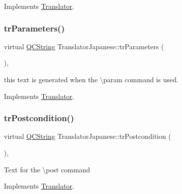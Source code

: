 Implements \mbox{\hyperlink{class_translator}{Translator}}.

\mbox{\label{class_translator_japanese_a34997a683bc00a6b9b4410731af7ad08}} 
\subsubsection{\texorpdfstring{trParameters()}{trParameters()}}
{\footnotesize\ttfamily virtual \mbox{\hyperlink{class_q_c_string}{Q\+C\+String}} Translator\+Japanese\+::tr\+Parameters (\begin{DoxyParamCaption}{ }\end{DoxyParamCaption})\hspace{0.3cm}{\ttfamily [inline]}, {\ttfamily [virtual]}}

this text is generated when the \textbackslash{}param command is used. 

Implements \mbox{\hyperlink{class_translator}{Translator}}.

\mbox{\label{class_translator_japanese_ab4a35f62a710fe919436c217ba9b949a}} 
\subsubsection{\texorpdfstring{trPostcondition()}{trPostcondition()}}
{\footnotesize\ttfamily virtual \mbox{\hyperlink{class_q_c_string}{Q\+C\+String}} Translator\+Japanese\+::tr\+Postcondition (\begin{DoxyParamCaption}{ }\end{DoxyParamCaption})\hspace{0.3cm}{\ttfamily [inline]}, {\ttfamily [virtual]}}

Text for the \textbackslash{}post command 

Implements \mbox{\hyperlink{class_translator}{Translator}}.

\mbox{\label{class_translator_japanese_a79d08f0f287feb495aae81306185ac54}} 
